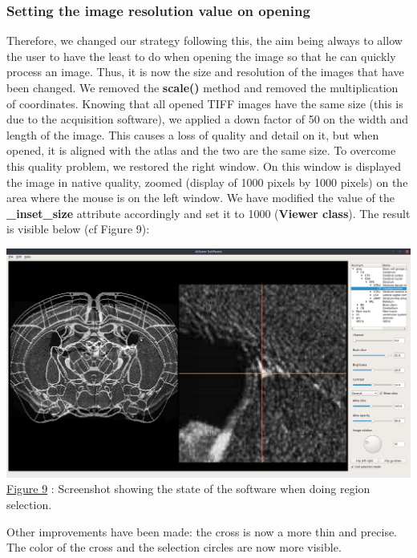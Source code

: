 \documentclass[a4paper,12pt]{report}
\begin{document}
\subsubsection{Setting the image resolution value on opening}
Therefore, we changed our strategy following this, the aim being always to allow the user to have the least to do when opening the image so that he can quickly process an image. Thus, it is now the size and resolution of the images that have been changed. We removed the \textbf{scale()} method and removed the multiplication of coordinates. Knowing that all opened TIFF images have the same size (this is due to the acquisition software), we applied a down factor of 50 on the width and length of the image. This causes a loss of quality and detail on it, but when opened, it is aligned with the atlas and the two are the same size. To overcome this quality problem, we restored the right window. On this window is displayed the image in native quality, zoomed (display of 1000 pixels by 1000 pixels) on the area where the mouse is on the left window. We have modified the value of the \textbf{\_inset\_size} attribute accordingly and set it to 1000 (\textbf{Viewer class}). The result is visible below (cf Figure 9):

\begin{center} \includegraphics[scale=0.22]{finalVersionUsingSoftware.png}\\
\underline{Figure 9} : Screenshot showing the state of the software when doing region selection. \vspace{1\baselineskip}\\ \end{center}

Other improvements have been made: the cross is now a more thin and precise. The color of the cross and the selection circles are now more visible. \\
\end{document}
